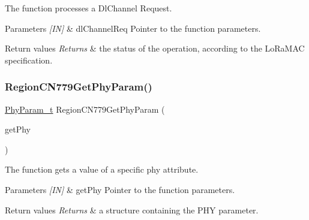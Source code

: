 The function processes a Dl\+Channel Request. 


\begin{DoxyParams}{Parameters}
{\em \mbox{[}\+I\+N\mbox{]}} & dl\+Channel\+Req Pointer to the function parameters.\\
\hline
\end{DoxyParams}

\begin{DoxyRetVals}{Return values}
{\em Returns} & the status of the operation, according to the Lo\+Ra\+M\+AC specification. \\
\hline
\end{DoxyRetVals}
\mbox{\label{group__REGIONCN779_gab45c9a48b25622ab197ab8510cc7cbc0}} 
\subsubsection{\texorpdfstring{Region\+C\+N779\+Get\+Phy\+Param()}{RegionCN779GetPhyParam()}}
{\footnotesize\ttfamily \hyperlink{group__REGION_gaed159b26e5c4677236b6e8677019db30}{Phy\+Param\+\_\+t} Region\+C\+N779\+Get\+Phy\+Param (\begin{DoxyParamCaption}\item[{\hyperlink{group__REGION_gab471483fff904f4f89bbc03f7fc380ab}{Get\+Phy\+Params\+\_\+t} $\ast$}]{get\+Phy }\end{DoxyParamCaption})}



The function gets a value of a specific phy attribute. 


\begin{DoxyParams}{Parameters}
{\em \mbox{[}\+I\+N\mbox{]}} & get\+Phy Pointer to the function parameters.\\
\hline
\end{DoxyParams}

\begin{DoxyRetVals}{Return values}
{\em Returns} & a structure containing the P\+HY parameter. \\
\hline
\end{DoxyRetVals}
\mbox{\label{group__REGIONCN779_ga85953f37b52567b54689c354671a14f6}} 
